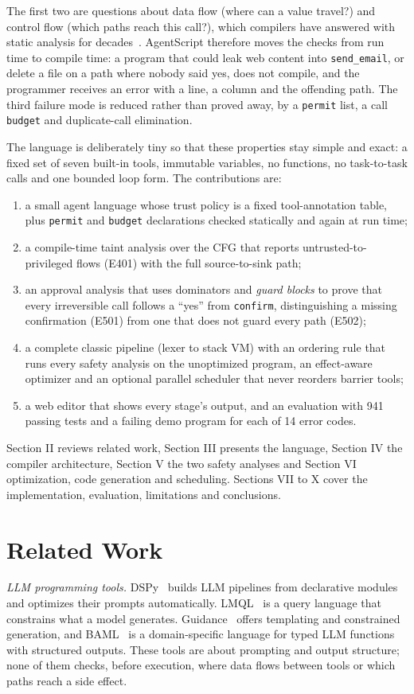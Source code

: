 \documentclass[conference]{IEEEtran}
\begin{document}
The first two are questions about data flow (where can a value travel?) and control flow (which paths reach this call?), which compilers have answered with static analysis for decades~\cite{aho}. AgentScript therefore moves the checks from run time to compile time: a program that could leak web content into \texttt{send\_email}, or delete a file on a path where nobody said yes, does not compile, and the programmer receives an error with a line, a column and the offending path. The third failure mode is reduced rather than proved away, by a \texttt{permit} list, a call \texttt{budget} and duplicate-call elimination.

The language is deliberately tiny so that these properties stay simple and exact: a fixed set of seven built-in tools, immutable variables, no functions, no task-to-task calls and one bounded loop form. The contributions are:

\begin{enumerate}
\item a small agent language whose trust policy is a fixed tool-annotation table, plus \texttt{permit} and \texttt{budget} declarations checked statically and again at run time;
\item a compile-time taint analysis over the CFG that reports untrusted-to-privileged flows (E401) with the full source-to-sink path;
\item an approval analysis that uses dominators and \emph{guard blocks} to prove that every irreversible call follows a ``yes'' from \texttt{confirm}, distinguishing a missing confirmation (E501) from one that does not guard every path (E502);
\item a complete classic pipeline (lexer to stack VM) with an ordering rule that runs every safety analysis on the unoptimized program, an effect-aware optimizer and an optional parallel scheduler that never reorders barrier tools;
\item a web editor that shows every stage's output, and an evaluation with 941 passing tests and a failing demo program for each of 14 error codes.
\end{enumerate}

Section II reviews related work, Section III presents the language, Section IV the compiler architecture, Section V the two safety analyses and Section VI optimization, code generation and scheduling. Sections VII to X cover the implementation, evaluation, limitations and conclusions.

\section{Related Work}
\emph{LLM programming tools.} DSPy~\cite{dspy} builds LLM pipelines from declarative modules and optimizes their prompts automatically. LMQL~\cite{lmql} is a query language that constrains what a model generates. Guidance~\cite{guidance} offers templating and constrained generation, and BAML~\cite{baml} is a domain-specific language for typed LLM functions with structured outputs. These tools are about prompting and output structure; none of them checks, before execution, where data flows between tools or which paths reach a side effect.
\end{document}
